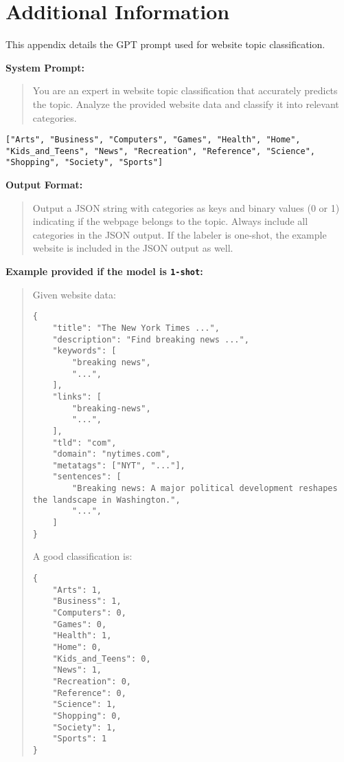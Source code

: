\section{Additional Information}
\label{app:prompt}
This appendix details the GPT prompt used for website topic classification. 

\textbf{System Prompt:} 
\begin{quote}
    You are an expert in website topic classification that accurately predicts the topic. Analyze the provided website data and classify it into relevant categories.
\end{quote}

\begin{verbatim}
["Arts", "Business", "Computers", "Games", "Health", "Home", 
"Kids_and_Teens", "News", "Recreation", "Reference", "Science", 
"Shopping", "Society", "Sports"]
\end{verbatim}

\textbf{Output Format:}
\begin{quote}
    Output a JSON string with categories as keys and binary values (0 or 1) indicating if the webpage belongs to the topic. Always include all categories in the JSON output. If the labeler is one-shot, the example website is included in the JSON output as well.
\end{quote}

\textbf{Example provided if the model is \texttt{1-shot}:}
\begin{quote}
    Given website data: \\
    \begin{verbatim}
{         
    "title": "The New York Times ...",
    "description": "Find breaking news ...",
    "keywords": [
        "breaking news",
        "...",
    ],
    "links": [
        "breaking-news",
        "...",
    ],
    "tld": "com",
    "domain": "nytimes.com",
    "metatags": ["NYT", "..."],
    "sentences": [
        "Breaking news: A major political development reshapes the landscape in Washington.",
        "...",
    ]
}
        \end{verbatim}
    A good classification is:
    \begin{verbatim}
{
    "Arts": 1,
    "Business": 1,
    "Computers": 0,
    "Games": 0,
    "Health": 1,
    "Home": 0,
    "Kids_and_Teens": 0,
    "News": 1,
    "Recreation": 0,
    "Reference": 0,
    "Science": 1,
    "Shopping": 0,
    "Society": 1,
    "Sports": 1
}
    \end{verbatim}
\end{quote}

